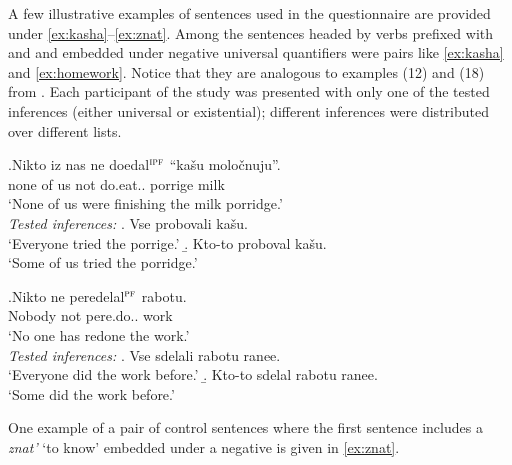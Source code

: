 A few illustrative examples of sentences used in the questionnaire are provided under \ref{ex:kasha}--\ref{ex:znat}. Among the sentences headed by verbs prefixed with  and  and embedded under negative universal quantifiers were pairs like \ref{ex:kasha} and \ref{ex:homework}. Notice that they are analogous to examples (12) and (18) from \citealt{Chemla:09}. Each participant  of the study was presented with only one of the tested inferences (either universal or existential); different inferences were distributed over different lists.

\exg.\label{ex:kasha}Nikto iz nas ne doedal$^{\textsc{ipf}}$ ``ka\v{s}u molo\v{c}nuju''.\\
none of us not do.eat.. porrige milk\\
\trans `None of us were finishing the milk porridge.'\smallskip\\
\textit{Tested inferences:}
\a. Vse probovali ka\v{s}u.\\
`Everyone tried the porrige.'
\b. Kto-to proboval ka\v{s}u.\\
`Some of us tried the porridge.'


\exg.\label{ex:homework}Nikto ne peredelal$^{\textsc{pf}}$ rabotu.\\
Nobody not pere.do.. work\\
\trans `No one has redone the work.'\smallskip\\
\textit{Tested inferences:}
\a. \label{test:homework1}Vse sdelali rabotu ranee.\\
`Everyone did the work before.'
\b. \label{test:homework2}Kto-to sdelal rabotu ranee.\\
`Some did the work before.'


One example of a pair of control sentences where the first sentence includes a  \textit{znat'} `to know' embedded under a negative  is given in \ref{ex:znat}.

